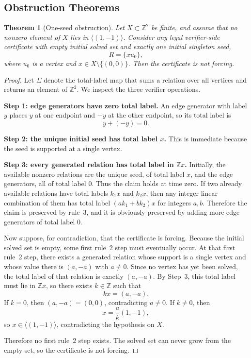 \documentclass[11pt]{article}
\newtheorem{theorem}{Theorem}
\theoremstyle{definition}
\newcommand{\Z}{\mathbb{Z}}
\begin{document}
\subsection{Obstruction Theorems}

\begin{theorem}[One-seed obstruction]
\label{thm:one-seed}
Let $X\subset \Z^2$ be finite, and assume that no nonzero element of $X$ lies in $\langle(1,-1)\rangle$. Consider any legal verifier-side certificate with empty initial solved set and exactly one initial singleton seed,
\[
R=\{x u_0\},
\]
where $u_0$ is a vertex and $x\in X\setminus\{(0,0)\}$. Then the certificate is not forcing.
\end{theorem}

\begin{proof}
Let $\Sigma$ denote the total-label map that sums a relation over all vertices and returns an element of $\Z^2$. We inspect the three verifier operations.

\textbf{Step 1: edge generators have zero total label.}
An edge generator with label $y$ places $y$ at one endpoint and $-y$ at the other endpoint, so its total label is
\[
y+(-y)=0.
\]

\textbf{Step 2: the unique initial seed has total label $x$.}
This is immediate because the seed is supported at a single vertex.

\textbf{Step 3: every generated relation has total label in $\Z x$.}
Initially, the available nonzero relations are the unique seed, of total label $x$, and the edge generators, all of total label $0$. Thus the claim holds at time zero. If two already available relations have total labels $k_1x$ and $k_2x$, then any integer linear combination of them has total label $(a k_1+b k_2)x$ for integers $a,b$. Therefore the claim is preserved by rule~3, and it is obviously preserved by adding more edge generators of total label $0$.

Now suppose, for contradiction, that the certificate is forcing. Because the initial solved set is empty, some first rule~2 step must eventually occur. At that first rule~2 step, there exists a generated relation whose support is a single vertex and whose value there is $(a,-a)$ with $a\neq 0$. Since no vertex has yet been solved, the total label of that relation is exactly $(a,-a)$. By Step~3, this total label must lie in $\Z x$, so there exists $k\in \Z$ such that
\[
kx=(a,-a).
\]
If $k=0$, then $(a,-a)=(0,0)$, contradicting $a\neq 0$. If $k\neq 0$, then
\[
x=\frac{a}{k}(1,-1),
\]
so $x\in \langle(1,-1)\rangle$, contradicting the hypothesis on $X$.

Therefore no first rule~2 step exists. The solved set can never grow from the empty set, so the certificate is not forcing.
\end{proof}
\end{document}
